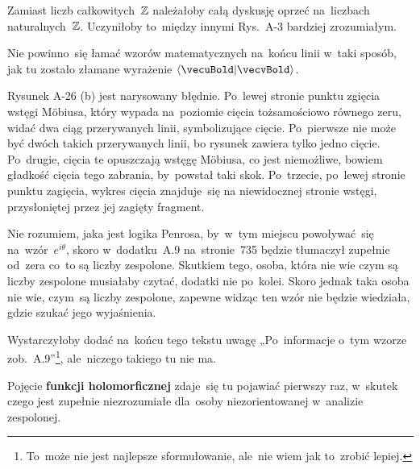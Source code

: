 \documentclass[a4paper,11pt]{article}
\numberwithin{equation}{section}
\begin{document}
\VerSpaceFour





\noindent
{} Zamiast liczb całkowitych~$\mathbb{Z}$ należałoby całą
dyskusję oprzeć na~liczbach naturalnych~$\mathbb{Z}$. Uczyniłoby to~między
innymi Rys.~A-3 bardziej zrozumiałym.

\VerSpaceFour





\noindent
{} Nie powinno~się łamać wzorów matematycznych
na~końcu linii w~taki sposób, jak tu zostało złamane wyrażenie
$\langle \vecuBold | \vecvBold \rangle$.

\VerSpaceFour





\noindent
{} Rysunek A-26 (b) jest narysowany błędnie. Po~lewej stronie punktu
zgięcia wstęgi M\"{o}biusa, który wypada na~poziomie cięcia tożsamościowo
równego zeru, widać dwa ciąg przerywanych linii, symbolizujące cięcie.
Po~pierwsze nie może być dwóch takich przerywanych linii, bo rysunek
zawiera tylko jedno cięcie. Po~drugie, cięcia te opuszczają wstęgę
M\"{o}biusa, co jest niemożliwe, bowiem gładkość cięcia tego zabrania,
by~powstał taki skok. Po~trzecie, po~lewej stronie punktu zagięcia, wykres
cięcia znajduje~się na niewidocznej stronie wstęgi, przysłoniętej przez jej
zagięty fragment.

\VerSpaceFour





\noindent
{} Nie rozumiem, jaka jest logika Penrosa, by~w~tym
miejscu powoływać~się na~wzór~$e^{ i \theta }$, skoro w~dodatku~A.9
na~stronie~735 będzie tłumaczył zupełnie od~zera co~to są liczby
zespolone. Skutkiem tego, osoba, która nie wie czym są liczby
zespolone musiałaby czytać, dodatki nie po~kolei. Skoro jednak taka
osoba nie wie, czym~są liczby zespolone, zapewne widząc ten wzór nie
będzie wiedziała, gdzie szukać jego wyjaśnienia.

Wystarczyłoby dodać na~końcu tego tekstu uwagę „Po~informacje o~tym
wzorze zob.~A.9”\footnote{To~może nie jest najlepsze sformułowanie,
  ale~nie wiem jak to~zrobić lepiej.}, ale~niczego takiego tu nie ma.

\VerSpaceFour





\noindent
{} Pojęcie \textbf{funkcji holomorficznej} zdaje~się tu
pojawiać pierwszy raz, w~skutek czego jest zupełnie niezrozumiałe
dla~osoby niezorientowanej w~analizie zespolonej.
\end{document}
